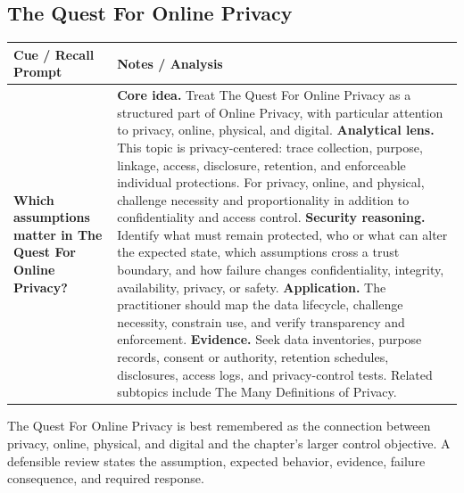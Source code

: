 \documentclass[11pt]{article}
\newcommand{\CornellHeader}{%
\rowcolor{Navy}\color{white}\bfseries Cue / Recall Prompt & \color{white}\bfseries Notes / Analysis\\\hline}
\newcommand{\CornellRow}[2]{%
\cellcolor{CueGray}\RaggedRight\textbf{#1} & \RaggedRight #2\\\hline}
\begin{document}
\subsection*{The Quest For Online Privacy}
\begin{longtable}{>{\RaggedRight\arraybackslash}p{}|>{\RaggedRight\arraybackslash}p{}}
\CornellHeader
\CornellRow{Which assumptions matter in The Quest For Online Privacy?}{\textbf{Core idea.} Treat The Quest For Online Privacy as a structured part of Online Privacy, with particular attention to privacy, online, physical, and digital. \textbf{Analytical lens.} This topic is privacy-centered: trace collection, purpose, linkage, access, disclosure, retention, and enforceable individual protections. For privacy, online, and physical, challenge necessity and proportionality in addition to confidentiality and access control. \textbf{Security reasoning.} Identify what must remain protected, who or what can alter the expected state, which assumptions cross a trust boundary, and how failure changes confidentiality, integrity, availability, privacy, or safety. \textbf{Application.} The practitioner should map the data lifecycle, challenge necessity, constrain use, and verify transparency and enforcement. \textbf{Evidence.} Seek data inventories, purpose records, consent or authority, retention schedules, disclosures, access logs, and privacy-control tests. Related subtopics include The Many Definitions of Privacy.}
\end{longtable}
\begin{topicsummary}
The Quest For Online Privacy is best remembered as the connection between privacy, online, physical, and digital and the chapter's larger control objective. A defensible review states the assumption, expected behavior, evidence, failure consequence, and required response.
\end{topicsummary}
\end{document}

